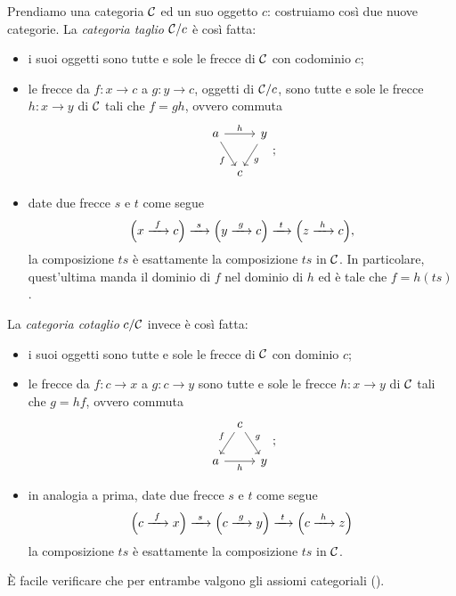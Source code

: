 \begin{costruzione}
Prendiamo una categoria \(\mathcal C\) ed un suo oggetto \(c\): costruiamo così due nuove categorie.\newline
La {\em categoria taglio} \(\mathcal C/c\) è così fatta:
\begin{itemize}
\item i suoi oggetti sono tutte e sole le frecce di \(\mathcal C\) con codominio \(c\);
\item le frecce da \(f : x \to c\) a \(g : y \to c\), oggetti di \(\mathcal C/c\), sono tutte e sole le frecce \(h : x \to y\) di \(\mathcal C\) tali che \(f = gh\), ovvero commuta
\[\begin{tikzcd}[column sep = tiny]
a \ar["f",dr,swap] \ar["h",rr] &   & y \ar["g",dl] \\
                               & c &
\end{tikzcd};\]
\item date due frecce \(s\) e \(t\) come segue
\[%
\Big(x \functo{f} c\Big) \functo{s}%
\Big(y \functo{g} c\Big) \functo{t}%
\Big(z \functo{h} c\Big)
,\]
la composizione \(ts\) è esattamente la composizione \(ts\) in \(\mathcal C\). In particolare, quest'ultima manda il dominio di \(f\) nel dominio di \(h\) ed è tale che \(f = h(ts)\).
\end{itemize}
%
La {\em categoria cotaglio} \(c/\mathcal C\) invece è così fatta:
\begin{itemize}
\item i suoi oggetti sono tutte e sole le frecce di \(\mathcal C\) con dominio \(c\);
\item le frecce da \(f : c \to x\) a \(g : c \to y\) sono tutte e sole le frecce \(h : x \to y\) di \(\mathcal C\) tali che \(g = hf\), ovvero commuta
\[\begin{tikzcd}[column sep = tiny]
                     & c \ar["f", dl, swap] \ar["g", dr] &   \\
a \ar["h", rr, swap] &                                   & y
\end{tikzcd};\]
\item in analogia a prima, date due frecce \(s\) e \(t\) come segue
%
\[\Big(c \xrightarrow{\ f\ } x\Big) \xrightarrow{\ s\ }
\Big(c \xrightarrow{\ g\ } y\Big) \xrightarrow{\ t\ }
\Big(c \xrightarrow{\ h\ } z\Big)\]
%
la composizione \(ts\) è esattamente la composizione \(ts\) in \(\mathcal C\).
\end{itemize}
%
È facile verificare che per entrambe valgono gli assiomi categoriali (\perlettore{}).
\end{costruzione}

